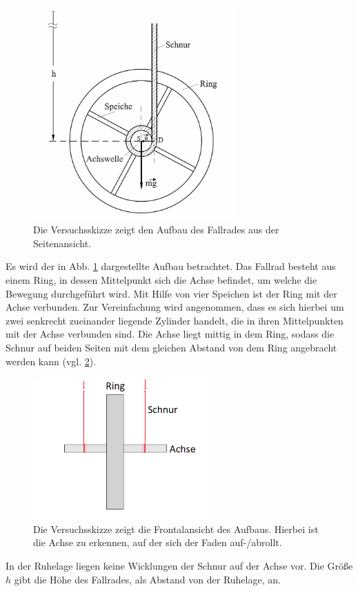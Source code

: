 			\begin{figure}[ht]
				\centering
				\includegraphics[width=0.7\textwidth]{fallrad_skizze.png}
				\caption{Die Versuchsskizze zeigt den Aufbau des Fallrades aus der Seitenansicht.}
				\label{fig:FallradSkizze}	
			\end{figure}
			Es wird der in Abb. \ref{fig:FallradSkizze} dargestellte Aufbau betrachtet. 
			Das Fallrad besteht aus einem Ring, in dessen Mittelpunkt sich die Achse befindet, um welche die Bewegung durchgeführt wird. Mit Hilfe von vier Speichen ist der Ring mit der Achse verbunden. Zur Vereinfachung wird angenommen, dass es sich hierbei um zwei senkrecht zueinander liegende Zylinder handelt, die in ihren Mittelpunkten mit der Achse verbunden sind. 
			Die Achse liegt mittig in dem Ring, sodass die Schnur auf beiden Seiten mit dem gleichen Abstand von dem Ring angebracht werden kann (vgl. \ref{fig:FallradFrontal}). 
			\begin{figure}[ht]
				\centering
				\includegraphics[width=0.6\textwidth]{fallrad_frontal.png}
				\caption{Die Versuchsskizze zeigt die Frontalansicht des Aufbaus. Hierbei ist die Achse zu erkennen, auf der sich der Faden auf-/abrollt.}
				\label{fig:FallradFrontal}	
			\end{figure}
			In der Ruhelage liegen keine Wicklungen der Schnur auf der Achse vor. Die Größe $h$ gibt die Höhe des Fallrades, als Abstand von der Ruhelage, an. 
		
